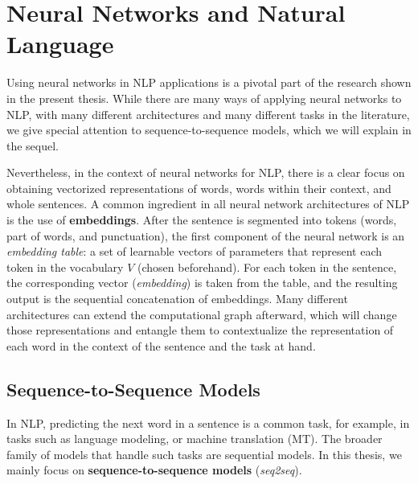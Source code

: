 \section{Neural Networks and Natural Language}

\noindent Using neural networks in NLP applications is a pivotal part
of the research shown in the present thesis. While there are many
ways of applying neural networks to NLP, with many different
architectures and many different tasks in the literature, we give
special attention to sequence-to-sequence models, which we will
explain in the sequel.

Nevertheless, in the context of neural networks for NLP, there is a
clear focus on obtaining vectorized representations of words, words
within their context, and whole sentences. A common ingredient in all
neural network architectures of NLP is the use of
\textbf{embeddings}. After the sentence is segmented into tokens
(words, part of words, and punctuation), the first component of the
neural network is an \textit{embedding table}: a set of learnable
vectors of parameters that represent each token in the vocabulary $V$
(chosen beforehand). For each token in the sentence, the
corresponding vector (\textit{embedding}) is taken from the table,
and the resulting output is the sequential concatenation of
embeddings. Many different architectures can extend the computational
graph afterward, which will change those representations and entangle
them to contextualize the representation of each word in the context
of the sentence and the task at hand.

\subsection{Sequence-to-Sequence Models}

\noindent In NLP, predicting the next word in a sentence is a common
task, for example, in tasks such as language modeling, or machine translation (MT). The
broader family of models that handle such tasks are sequential
models. In this thesis, we mainly focus on
\textbf{sequence-to-sequence models} (\textit{seq2seq}).

